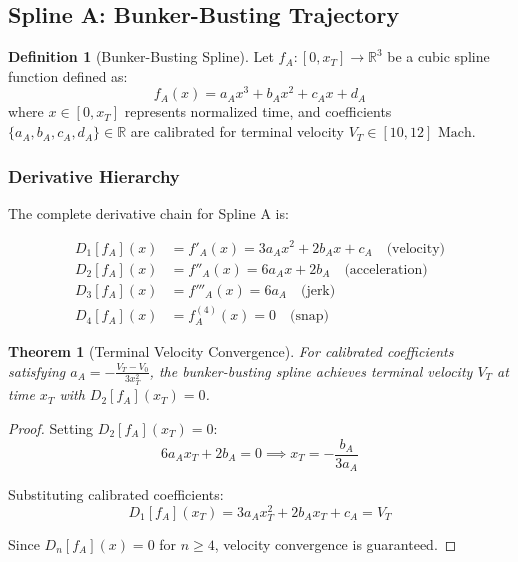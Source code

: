 \documentclass[11pt,a4paper]{article}
\theoremstyle{definition}
\newtheorem{definition}{Definition}[section]
\theoremstyle{plain}
\newtheorem{theorem}{Theorem}[section]
\newcommand{\mach}{\text{ Mach}}
\begin{document}
\subsection{Spline A: Bunker-Busting Trajectory}

\begin{definition}[Bunker-Busting Spline]
Let $f_A: [0, x_T] \rightarrow \mathbb{R}^3$ be a cubic spline function defined as:
\begin{equation}
f_A(x) = a_Ax^3 + b_Ax^2 + c_Ax + d_A
\end{equation}
where $x \in [0, x_T]$ represents normalized time, and coefficients $\{a_A, b_A, c_A, d_A\} \in \mathbb{R}$ are calibrated for terminal velocity $V_T \in [10, 12]\mach$.
\end{definition}

\subsubsection{Derivative Hierarchy}

The complete derivative chain for Spline A is:

\begin{align}
D_1[f_A](x) &= f'_A(x) = 3a_Ax^2 + 2b_Ax + c_A \quad \text{(velocity)} \\
D_2[f_A](x) &= f''_A(x) = 6a_Ax + 2b_A \quad \text{(acceleration)} \\
D_3[f_A](x) &= f'''_A(x) = 6a_A \quad \text{(jerk)} \\
D_4[f_A](x) &= f^{(4)}_A(x) = 0 \quad \text{(snap)}
\end{align}

\begin{theorem}[Terminal Velocity Convergence]
For calibrated coefficients satisfying $a_A = -\frac{V_T - V_0}{3x_T^2}$, the bunker-busting spline achieves terminal velocity $V_T$ at time $x_T$ with $D_2[f_A](x_T) = 0$.
\end{theorem}

\begin{proof}
Setting $D_2[f_A](x_T) = 0$:
\begin{equation}
6a_Ax_T + 2b_A = 0 \implies x_T = -\frac{b_A}{3a_A}
\end{equation}

Substituting calibrated coefficients:
\begin{equation}
D_1[f_A](x_T) = 3a_Ax_T^2 + 2b_Ax_T + c_A = V_T
\end{equation}

Since $D_n[f_A](x) = 0$ for $n \geq 4$, velocity convergence is guaranteed.
\end{proof}
\end{document}
